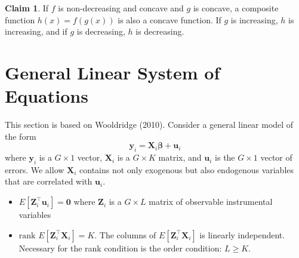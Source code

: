 \documentclass[11pt, a4paper]{article}
\numberwithin{figure}{section}
\theoremstyle{definition}
\newcommand{\0}{\mathbf{0}}
\newcommand{\rank}{\text{rank }}
\newcommand{\bmX}{\bm{X}}
\newcommand{\bmZ}{\bm{Z}}
\newcommand{\bmu}{\bm{u}}
\newcommand{\bmy}{\bm{y}}
\newtheorem{claim}{Claim}
\begin{document}
    
    
    
    
\begin{claim}
    If $f$ is non-decreasing and concave and $g$ is concave, a composite function $h(x) = f(g(x))$ is also a concave function. If $g$ is increasing, $h$ is increasing, and if $g$ is decreasing, $h$ is decreasing.
\end{claim}
    
    

\section{General Linear System of Equations}
This section is based on Wooldridge (2010).
Consider a general linear model of the form 
\[\bmy_i = \bmX_i \bm{\beta} + \bmu_i\]
where $\bmy_i$ is a $G\times 1$ vector, $\bmX_i$ is a $G\times K$ matrix, and $\bmu_i$ is the $G\times 1$ vector of errors.
We allow $\bmX_i$ contains not only exogenous but also endogenous variables that are correlated with $\bmu_i$.

\begin{itemize}
    \item $E[\bmZ_i^\top \bmu_i] = \bm0$ where $\bmZ_i$ is a $G\times L$ matrix of observable instrumental variables
    \item $\rank E[\bmZ_i^\top \bmX_i] = K$. The columns of $ E[\bmZ_i^\top \bmX_i]$ is linearly independent. Necessary for the rank condition is the order condition: $L\ge K$.
\end{itemize}
  
\end{document}
